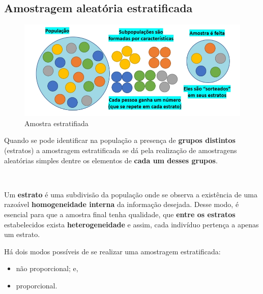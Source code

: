 \documentclass[
]{book}
\providecommand{\tightlist}{%
  \setlength{\itemsep}{0pt}\setlength{\parskip}{0pt}}
\begin{document}
\hfill\break

\hypertarget{amostragem-aleatuxf3ria-estratificada}{%
\subsection{Amostragem aleatória estratificada}\label{amostragem-aleatuxf3ria-estratificada}}

\hfill\break

\begin{figure}

{\centering \includegraphics[width=0.8\linewidth]{images7/estratificada2} 

}

\caption{Amostra estratifiada}\label{fig:fig38}
\end{figure}

\hfill\break

Quando se pode identificar na população a presença de \textbf{grupos distintos} (estratos) a amostragem estratificada se dá pela realização de amostragens aleatórias simples dentre os elementos de \textbf{cada um desses grupos}.

~

Um \textbf{estrato} é uma subdivisão da população onde se observa a existência de uma razoável \textbf{homogeneidade interna} da informação desejada. Desse modo, é esencial para que a amostra final tenha qualidade, que \textbf{entre os estratos} estabelecidos exista \textbf{heterogeneidade} e assim, cada indivíduo pertença a apenas um estrato.

\hfill\break

Há dois modos possíveis de se realizar uma amostragem estratificada:

\hfill\break

\begin{itemize}
\tightlist
\item
  não proporcional; e,
\item
  proporcional.
\end{itemize}

\hfill\break
\end{document}
